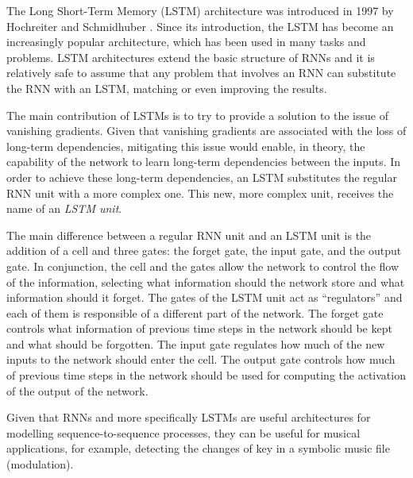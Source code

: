 

The Long Short-Term Memory (LSTM) architecture was
introduced in 1997 by Hochreiter and Schmidhuber
\parencite{hochreiter1997long}. Since its introduction, the
LSTM has become an increasingly popular architecture, which
has been used in many tasks and problems. LSTM architectures
extend the basic structure of RNNs and it is relatively safe
to assume that any problem that involves an RNN can
substitute the RNN with an LSTM, matching or even improving
the results.

The main contribution of LSTMs is to try to provide a
solution to the issue of vanishing gradients. Given that
vanishing gradients are associated with the loss of
long-term dependencies, mitigating this issue would enable,
in theory, the capability of the network to learn long-term
dependencies between the inputs. In order to achieve these
long-term dependencies, an LSTM substitutes the regular RNN
unit with a more complex one. This new, more complex unit,
receives the name of an \emph{LSTM unit}.

The main difference between a regular RNN unit and an LSTM
unit is the addition of a cell and three gates: the forget
gate, the input gate, and the output gate. In conjunction,
the cell and the gates allow the network to control the flow
of the information, selecting what information should the
network store and what information should it forget. The
gates of the LSTM unit act as ``regulators'' and each of
them is responsible of a different part of the network. The
forget gate controls what information of previous time steps
in the network should be kept and what should be forgotten.
The input gate regulates how much of the new inputs to the
network should enter the cell. The output gate controls how
much of previous time steps in the network should be used
for computing the activation of the output of the network.

Given that RNNs and more specifically LSTMs are useful
architectures for modelling sequence-to-sequence processes,
they can be useful for musical applications, for example,
detecting the changes of key in a symbolic music file
(modulation).


